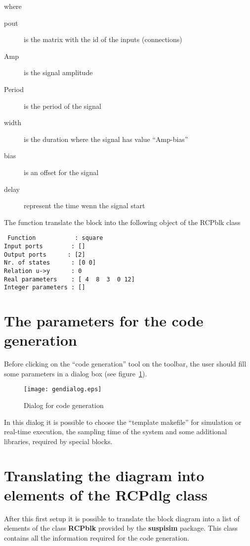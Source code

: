 where
 
 \begin{description}
 \item[pout] is the matrix with the id of the inputs (connections)
 \item [Amp] is the signal amplitude
 \item [Period] is the period of the signal
 \item [width] is the duration where the signal has value ``Amp-bias''
 \item [bias] is an offset for the signal
 \item [delay] represent the time wenn the signal start
 \end{description}
 
 The function translate the block into the following object of the RCPblk class
 
 \begin{verbatim}
 Function           : square
Input ports        : []
Output ports      : [2]
Nr. of states      : [0 0]
Relation u->y      : 0
Real parameters    : [ 4  8  3  0 12]
Integer parameters : []
\end{verbatim}

\section{The parameters for the code generation}

Before clicking on the ``code generation'' tool on the toolbar, the user should fill some parameters in a dialog box (see figure~\ref{codedlg}).

 \begin{figure}[htbp]	%
 \centering
 \texttt{[image: gendialog.eps]}
 \caption{Dialog for code generation}
 \label{codedlg}
 \end{figure}

In this dialog it is possible to choose the ``template makefile'' for 
simulation or real-time execution, the sampling time of the system and some 
additional libraries, required by special blocks.

\section{Translating the diagram into elements of the RCPdlg class}
\label{Sect-IO}

After this first setup it is possible to translate the block diagram into a 
list of elements of the class \textbf{RCPblk} provided by the 
\textbf{suspisim} package. This class contains all the information required 
for the code generation.

